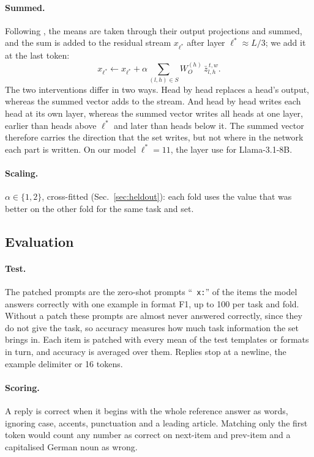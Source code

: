 \documentclass[10pt,a4paper]{article}
\newcommand{\p}[1]{``\texttt{#1}''}
\newcommand{\zbar}{\bar z}
\begin{document}
\paragraph{Summed.} Following \citet[Secs.~2 and~2.2]{davidson2025different}, the means are taken through their output projections and summed, and the sum is added to the residual stream $x_{\ell^*}$ after layer $\ell^* \approx L/3$; we add it at the last token:
\begin{equation}
x_{\ell^*} \leftarrow x_{\ell^*} + \alpha \sum_{(l,h)\in S} W_O^{(h)}\, \zbar^{\,t,w}_{l,h}.
\end{equation}
The two interventions differ in two ways. Head by head replaces a head's output, whereas the summed vector adds to the stream. And head by head writes each head at its own layer, whereas the summed vector writes all heads at one layer, earlier than heads above $\ell^*$ and later than heads below it. The summed vector therefore carries the direction that the set writes, but not where in the network each part is written. On our model $\ell^*=11$, the layer \citet[Sec.~2.2]{davidson2025different} use for Llama-3.1-8B.

\paragraph{Scaling.} $\alpha\in\{1,2\}$, cross-fitted (Sec.~\ref{sec:heldout}): each fold uses the value that was better on the other fold for the same task and set.

\subsection{Evaluation}\label{sec:evaluation}

\paragraph{Test.} The patched prompts are the zero-shot prompts \p{ x:} of the items the model answers correctly with one example in format F1, up to 100 per task and fold. Without a patch these prompts are almost never answered correctly, since they do not give the task, so accuracy measures how much task information the set brings in. Each item is patched with every mean of the test templates or formats in turn, and accuracy is averaged over them. Replies stop at a newline, the example delimiter or 16 tokens.

\paragraph{Scoring.} A reply is correct when it begins with the whole reference answer as words, ignoring case, accents, punctuation and a leading article. Matching only the first token would count any number as correct on next-item and prev-item and a capitalised German noun as wrong.
\end{document}
